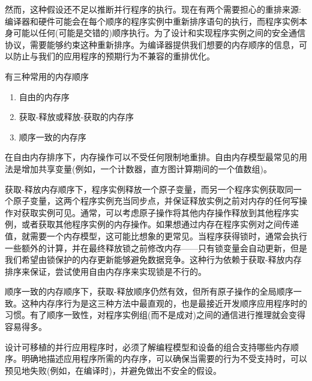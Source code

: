 然而，这种假设还不足以推断并行程序的执行。现在有两个需要担心的重排来源:编译器和硬件可能会在每个顺序的程序实例中重新排序语句的执行，而程序实例本身可能以任何(可能是交错的)顺序执行。为了设计和实现程序实例之间的安全通信协议，需要能够约束这种重新排序。为编译器提供我们想要的内存顺序的信息，可以防止与我们的应用程序的预期行为不兼容的重排优化。\par

有三种常用的内存顺序\par

\begin{enumerate}
	\item 自由的内存序
	\item 获取-释放或释放-获取的内存序
	\item 顺序一致的内存序
\end{enumerate}

在自由内存排序下，内存操作可以不受任何限制地重排。自由内存模型最常见的用法是增加共享变量(例如，一个计数器，直方图计算期间的一个值数组)。\par

获取-释放内存顺序下，程序实例释放一个原子变量，而另一个程序实例获取同一个原子变量，这两个程序实例充当同步点，并保证释放实例之前对内存的任何写操作对获取实例可见。通常，可以考虑原子操作将其他内存操作释放到其他程序实例，或者获取其他程序实例的内存操作。如果想通过内存在程序实例对之间传递值，就需要一个内存模型，这可能比想象的更常见。当程序获得锁时，通常会执行一些额外的计算，并在最终释放锁之前修改内存——只有锁变量会自动更新，但是我们希望由锁保护的内存更新能够避免数据竞争。这种行为依赖于获取-释放内存排序来保证，尝试使用自由内存序来实现锁是不行的。\par

顺序一致的内存顺序下，获取-释放顺序仍然有效，但所有原子操作的全局顺序一致。这种内存序行为是这三种方法中最直观的，也是最接近开发顺序应用程序时的习惯。有了顺序一致性，对程序实例组(而不是成对)之间的通信进行推理就会变得容易得多。\par

设计可移植的并行应用程序时，必须了解编程模型和设备的组合支持哪些内存顺序。明确地描述应用程序所需的内存序，可以确保当需要的行为不受支持时，可以预见地失败(例如，在编译时)，并避免做出不安全的假设。\par







































